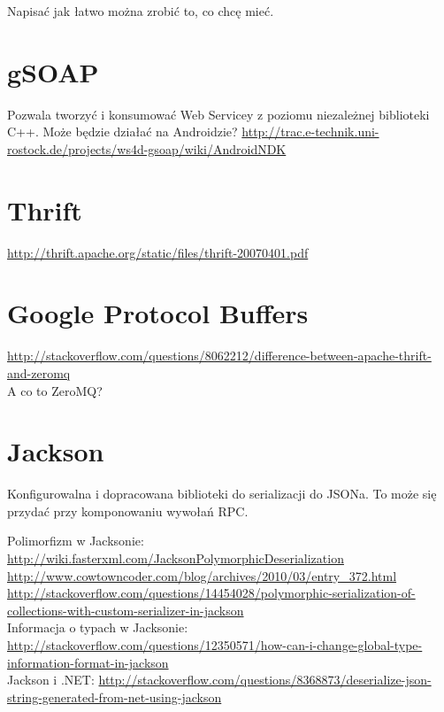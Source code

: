 Napisać jak łatwo można zrobić to, co chcę mieć.



\section{gSOAP}
Pozwala tworzyć i konsumować Web Servicey z poziomu niezależnej biblioteki C++. Może będzie działać na Androidzie?
\url{http://trac.e-technik.uni-rostock.de/projects/ws4d-gsoap/wiki/AndroidNDK}\\



\section{Thrift}
\url{http://thrift.apache.org/static/files/thrift-20070401.pdf}\\

\section{Google Protocol Buffers}
\url{http://stackoverflow.com/questions/8062212/difference-between-apache-thrift-and-zeromq}\\
A co to ZeroMQ?\\

\section{Jackson}
Konfigurowalna i dopracowana biblioteki do serializacji do JSONa. To może się przydać przy komponowaniu wywołań RPC.

Polimorfizm w Jacksonie:
\url{http://wiki.fasterxml.com/JacksonPolymorphicDeserialization}\\
\url{http://www.cowtowncoder.com/blog/archives/2010/03/entry_372.html}\\
\url{http://stackoverflow.com/questions/14454028/polymorphic-serialization-of-collections-with-custom-serializer-in-jackson}\\

Informacja o typach w Jacksonie:
\url{http://stackoverflow.com/questions/12350571/how-can-i-change-global-type-information-format-in-jackson}\\

Jackson i .NET:
\url{http://stackoverflow.com/questions/8368873/deserialize-json-string-generated-from-net-using-jackson}\\

